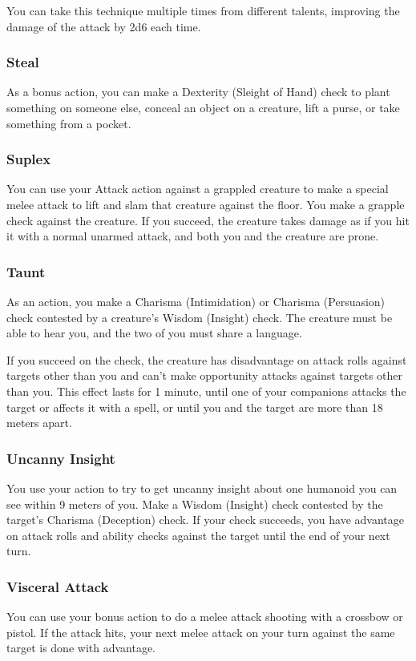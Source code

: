 You can take this technique multiple times from different talents, improving the damage of the attack by 2d6 each time.

\subsubsection{Steal} \label{tec::steal}
As a bonus action, you can make a Dexterity (Sleight of Hand) check to plant something on someone else, conceal an object on a creature, lift a purse, or take something from a pocket.

\subsubsection{Suplex} \label{tec::suplex}
You can use your Attack action against a grappled creature to make a special melee attack to lift and slam that creature against the floor.
You make a grapple check against the creature.
If you succeed, the creature takes damage as if you hit it with a normal unarmed attack, and both you and the creature are prone.

\subsubsection{Taunt} \label{tec::taunt}
As an action, you make a Charisma (Intimidation) or Charisma (Persuasion) check contested by a creature's Wisdom (Insight) check.
The creature must be able to hear you, and the two of you must share a language.

If you succeed on the check, the creature has disadvantage on attack rolls against targets other than you and can't make opportunity attacks against targets other than you.
This effect lasts for 1 minute, until one of your companions attacks the target or affects it with a spell, or until you and the target are more than 18 meters apart.

\subsubsection{Uncanny Insight} \label{tec::uncannyinsight}
You use your action to try to get uncanny insight about one humanoid you can see within 9 meters of you.
Make a Wisdom (Insight) check contested by the target's Charisma (Deception) check.
If your check succeeds, you have advantage on attack rolls and ability checks against the target until the end of your next turn.

\subsubsection{Visceral Attack} \label{tec::visceralattack}
You can use your bonus action to do a melee attack shooting with a crossbow or pistol.
If the attack hits, your next melee attack on your turn against the same target is done with advantage.

